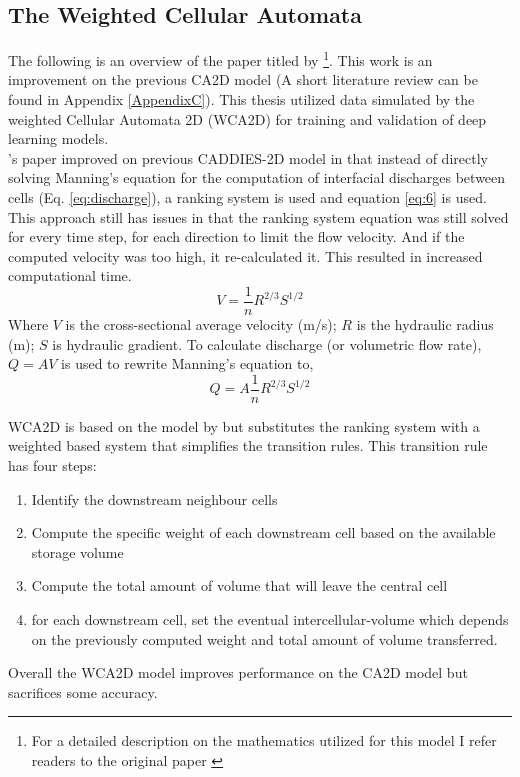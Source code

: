 \subsection*{The Weighted Cellular Automata}
The following is an overview of the paper titled   by \citeauthor{guidolin2016weighted} \footnote{For a detailed description on the mathematics utilized for this model I refer readers to the original paper \cite{guidolin2016weighted}}. This work is an improvement on the previous CA2D model (A short literature review can be found in Appendix \ref{AppendixC}). This thesis utilized data simulated by the weighted Cellular Automata 2D (WCA2D) for training and validation of deep learning models.\\

\citeauthor{Ghimire}'s paper improved on previous CADDIES-2D model in that instead of directly solving Manning's equation for the computation of interfacial discharges between cells (Eq. \ref{eq:discharge}), a ranking system is used and equation \ref{eq:6} is used. This approach still has issues in that the ranking system equation was still solved for every time step, for each direction to limit the flow velocity. And if the computed velocity was too high, it re-calculated it. This resulted in increased computational time.
\begin{equation}
	\label{eq:manning}
	V = \frac{1}{n} {R}^{2/3}S^{1/2}
\end{equation}
Where $V$ is the cross-sectional average velocity (m/s); $R$ is the hydraulic radius (m); $S$ is hydraulic gradient. To calculate discharge (or volumetric flow rate), $Q = AV$ is used to rewrite Manning's equation to,
\begin{equation}
	\label{eq:discharge}
	Q = A \frac{1}{n} {R}^{2/3}S^{1/2}
\end{equation}

WCA2D is based on the model by \citeauthor{Ghimire} but substitutes the ranking system with a weighted based system that simplifies the transition rules. This transition rule has four steps:
\begin{enumerate}
	\item Identify the downstream neighbour cells
	\item Compute the specific weight of each downstream cell based on the available storage volume
	\item Compute the total amount of volume that will leave the central cell
	\item for each downstream cell, set the eventual intercellular-volume which depends on the previously computed weight and total amount of volume transferred.
\end{enumerate}

Overall the WCA2D model improves performance on the CA2D model but sacrifices some accuracy.
